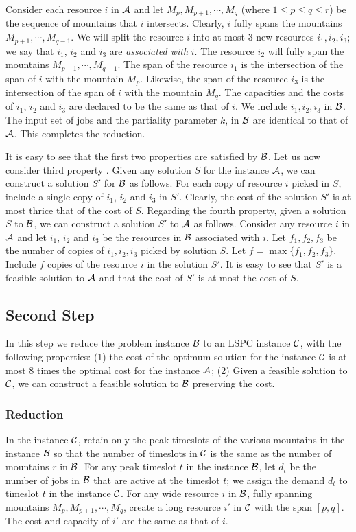 \documentclass[11pt]{article}
\newcommand{\lspc}{{\sc LSPC}}
\newcommand{\cC}{{\cal C}}
\newcommand{\cA} {{\cal A}}
\newcommand{\cB} {{\cal B}}
\begin{document}
Consider each resource $i$ in $\cA$ and let $M_p, M_{p+1}, \cdots, M_q$ (where $1 \leq p \leq q \leq r$) be the sequence of mountains that $i$ intersects. Clearly, $i$ fully spans the mountains $M_{p+1}, \cdots, M_{q-1}$. 
We will split the resource $i$ into at most $3$ new resources $i_1, i_2, i_3$; we say that $i_1$, $i_2$ and $i_3$ 
are {\em associated with} $i$.
The resource $i_2$ will fully span the mountains $M_{p+1}, \cdots, M_{q-1}$.
The span of the resource $i_1$ is the intersection of the span of  $i$ with the mountain $M_p$. Likewise, the span of the resource $i_3$ is the intersection of the span of $i$ with the 
mountain $M_q$.
The capacities and the costs of $i_1$, $i_2$ and $i_3$ are declared to be the same as that 
of $i$. We include $i_1, i_2, i_3$ in $\cB$. 
The input set of jobs and the partiality parameter $k$, in $\cB$ are identical to that of $\cA$. 
This completes the reduction.

It is easy to see that the first two properties are satisfied by $\cB$.
Let us now consider third property .
Given any solution $S$ for the instance $\cA$, we can construct a solution $S'$ for $\cB$ as follows. 
For each copy of resource $i$ picked in $S$, include a single copy of $i_1$, $i_2$ and $i_3$ in $S'$. 
Clearly, the cost of the solution $S'$ is at most thrice that of the cost of $S$.
Regarding the fourth property, given a solution $S$ to $\cB$, we can construct a solution $S'$ to $\cA$
as follows. Consider any resource $i$ in $\cA$ and let $i_1$, $i_2$ and $i_3$ be the resources in $\cB$
associated with $i$. Let $f_1, f_2, f_3$ be the number of copies of $i_1,i_2,i_3$ picked by solution $S$.
Let $f=\max\{f_1,f_2,f_3\}$. Include $f$ copies of the resource $i$ in the solution $S'$.
It is easy to see that $S'$ is a feasible solution to $\cA$ and that the cost of $S'$ is
at most the cost of $S$.

\subsection{Second Step}
In this step we reduce the problem instance $\cB$ to an {\lspc} instance $\cC$, with the following properties:
(1) the cost of the optimum solution for the instance $\cC$ is at most $8$ times the optimal cost for
the instance $\cA$; 
(2) Given a feasible solution to $\cC$, we can construct a feasible solution to $\cB$ preserving the cost. 

\subsubsection*{Reduction}
In the instance $\cC$,  retain only the peak timeslots of the various mountains in the instance $\cB$
so that the number of timeslots in $\cC$ is the same as the number of mountains $r$ in $\cB$. 
For any  peak timeslot $t$ in the instance $\cB$, let $d_t$ be the number of jobs in $\cB$ that are
active at the timeslot $t$; we assign the demand $d_t$ to timeslot $t$ in the instance $\cC$. 
 For any wide resource $i$ in $\cB$, fully spanning mountains $M_p, M_{p+1}, \cdots, M_q$, 
create a long resource $i'$ in $\cC$ with the span $[p,q]$. The cost and capacity of $i'$ are
the same as that of $i$. 
\end{document}
